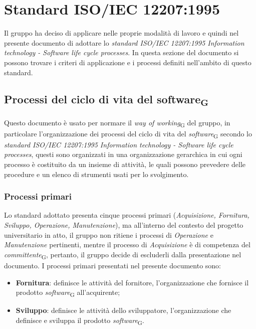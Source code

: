 \section{Standard ISO/IEC 12207:1995}
Il gruppo ha deciso di applicare nelle proprie modalità di lavoro e quindi nel presente documento di adottare lo \textit{standard ISO/IEC 12207:1995 Information technology - Software life cycle processes}. In questa sezione del documento si possono trovare i criteri di applicazione e i processi definiti nell'ambito di questo standard.
\subsection{Processi del ciclo di vita del software\textsubscript{G}}
Questo documento è usato per normare il \textit{way of working}\textsubscript{G} del gruppo, in particolare l'organizzazione dei processi del ciclo di vita del \textit{software}\textsubscript{G} secondo lo \textit{standard ISO/IEC 12207:1995 Information technology - Software life cycle processes}, questi sono organizzati in una organizzazione gerarchica in cui ogni processo è costituito da un insieme di attività, le quali possono prevedere delle procedure e un elenco di strumenti usati per lo svolgimento.
\subsubsection{Processi primari}
Lo standard adottato presenta cinque processi primari (\textit{Acquisizione, Fornitura, Sviluppo, Operazione, Manutenzione}), ma all’interno del contesto del progetto universitario in atto, il gruppo non ritiene i processi di \textit{Operazione} e \textit{Manutenzione} pertinenti, mentre il processo di \textit{Acquisizione} è di competenza del \textit{committente}\textsubscript{G}, pertanto, il gruppo decide di escluderli dalla presentazione nel documento.
I processi primari presentati nel presente documento sono:
\begin{itemize}
    \item \textbf{Fornitura}: definisce le attività del fornitore, l’organizzazione che fornisce il prodotto \textit{software}\textsubscript{G} all’acquirente;
    \item \textbf{Sviluppo}: definisce le attività dello sviluppatore, l’organizzazione che definisce e sviluppa il prodotto \textit{software}\textsubscript{G}.
\end{itemize}

